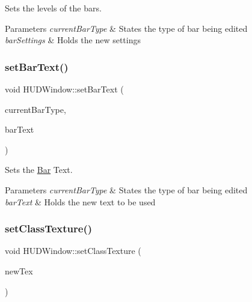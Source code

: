 Sets the levels of the bars. 


\begin{DoxyParams}{Parameters}
{\em current\+Bar\+Type} & States the type of bar being edited \\
\hline
{\em bar\+Settings} & Holds the new settings \\
\hline
\end{DoxyParams}
\mbox{\label{class_h_u_d_window_ab23fc81f35b182ae23d3ee85fbc7104e}} 
\subsubsection{\texorpdfstring{set\+Bar\+Text()}{setBarText()}}
{\footnotesize\ttfamily void H\+U\+D\+Window\+::set\+Bar\+Text (\begin{DoxyParamCaption}\item[{\hyperlink{_h_u_d_window_8h_a3bf4c8f0af36af02aca4222b3672bc1d}{Bar\+Type}}]{current\+Bar\+Type,  }\item[{std\+::string}]{bar\+Text }\end{DoxyParamCaption})}



Sets the \hyperlink{class_bar}{Bar} Text. 


\begin{DoxyParams}{Parameters}
{\em current\+Bar\+Type} & States the type of bar being edited \\
\hline
{\em bar\+Text} & Holds the new text to be used \\
\hline
\end{DoxyParams}
\mbox{\label{class_h_u_d_window_a07c5e4b149710405c278d9465bf7b8e2}} 
\subsubsection{\texorpdfstring{set\+Class\+Texture()}{setClassTexture()}}
{\footnotesize\ttfamily void H\+U\+D\+Window\+::set\+Class\+Texture (\begin{DoxyParamCaption}\item[{sf\+::\+Texture $\ast$}]{new\+Tex }\end{DoxyParamCaption})}



